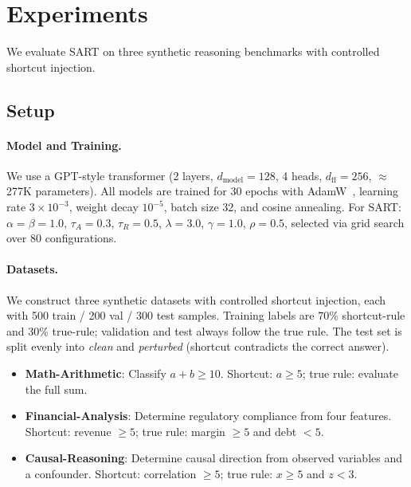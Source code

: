 \section{Experiments}
\label{sec:experiments}

We evaluate SART on three synthetic reasoning benchmarks with controlled shortcut injection.

\subsection{Setup}
\label{sec:exp_setup}

\paragraph{Model and Training.}
We use a GPT-style transformer (2 layers, $d_{\mathrm{model}}=128$, 4 heads, $d_{\mathrm{ff}}=256$, $\approx$277K parameters). All models are trained for 30 epochs with AdamW~\cite{loshchilov2019decoupled}, learning rate $3\times10^{-3}$, weight decay $10^{-5}$, batch size 32, and cosine annealing. For SART: $\alpha=\beta=1.0$, $\tau_A=0.3$, $\tau_R=0.5$, $\lambda=3.0$, $\gamma=1.0$, $\rho=0.5$, selected via grid search over 80 configurations.

\paragraph{Datasets.}
We construct three synthetic datasets with controlled shortcut injection, each with 500 train / 200 val / 300 test samples. Training labels are 70\% shortcut-rule and 30\% true-rule; validation and test always follow the true rule. The test set is split evenly into \emph{clean} and \emph{perturbed} (shortcut contradicts the correct answer).
\begin{itemize}[leftmargin=*, itemsep=1pt]
    \item \textbf{Math-Arithmetic}: Classify $a+b \geq 10$. Shortcut: $a \geq 5$; true rule: evaluate the full sum.
    \item \textbf{Financial-Analysis}: Determine regulatory compliance from four features. Shortcut: revenue $\geq 5$; true rule: margin $\geq 5$ and debt $< 5$.
    \item \textbf{Causal-Reasoning}: Determine causal direction from observed variables and a confounder. Shortcut: correlation $\geq 5$; true rule: $x \geq 5$ and $z < 3$.
\end{itemize}

